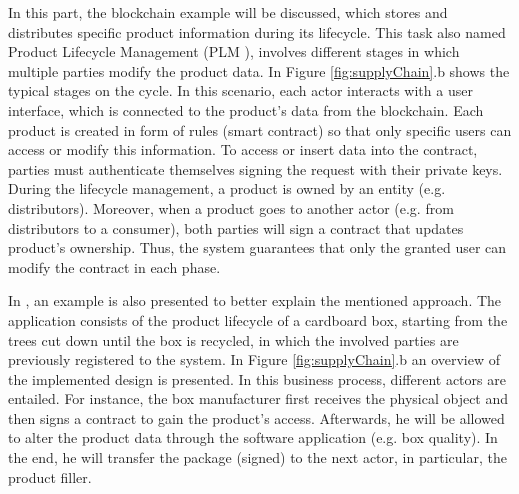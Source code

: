 In this part, the blockchain example \citep{abeyratne2016blockchain} will be discussed, which stores and distributes specific product information during its lifecycle. This task also named Product Lifecycle Management (PLM \citep{stark2015product}), involves different stages in which multiple parties modify the product data. In Figure \ref{fig:supplyChain}.b shows the typical stages on the cycle. In this scenario, each actor interacts with a user interface, which is connected to the product's data from the blockchain. Each product is created in form of rules (smart contract) so that only specific users can access or modify this information. To access or insert data into the contract, parties must authenticate themselves signing the request with their private keys. During the lifecycle management, a product is owned by an entity (e.g. distributors). Moreover, when a product goes to another actor (e.g. from distributors to a consumer), both parties will sign a contract that updates product's ownership. Thus, the system guarantees that only the granted user can modify the contract in each phase.

In \citep{abeyratne2016blockchain}, an example is also presented to better explain the mentioned approach. The application consists of the product lifecycle of a cardboard box, starting from the trees cut down until the box is recycled, in which the involved parties are previously registered to the system. In Figure \ref{fig:supplyChain}.b an overview of the implemented design is presented. In this business process, different actors are entailed. For instance, the box manufacturer first receives the physical object and then signs a contract to gain the product's access. Afterwards, he will be allowed to alter the product data through the software application (e.g. box quality). In the end, he will transfer the package (signed) to the next actor, in particular, the product filler.


